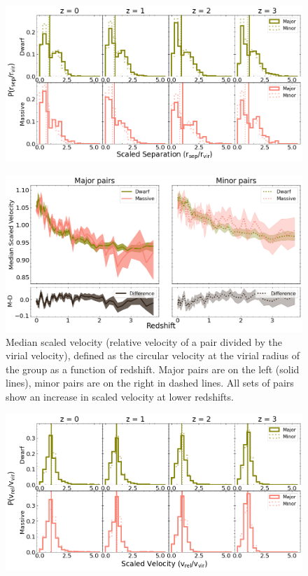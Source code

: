 \documentclass[twocolumn]{aastex631}
\begin{document}
\begin{figure}[htp]
  \centering
  \includegraphics[width=\textwidth]{scaledsep_distribution.png}
  \caption{}
  \label{fig:sep-scaled-dist}
\end{figure} 


\begin{figure}[htp]
  \centering
  \includegraphics[width=\textwidth]{scaledvel.png}
  \caption{Median scaled velocity (relative velocity of a pair divided by the virial velocity), defined as the circular velocity at the virial radius of the group as a function of redshift. 
  Major pairs are on the left (solid lines), minor pairs are on the right in dashed lines.
  All sets of pairs show an increase in scaled velocity at lower redshifts.
  }
  \label{fig:vel-scaled}
\end{figure} 

\begin{figure}[htp]
  \centering
  \includegraphics[width=\textwidth]{scaledvel_distribution.png}
  \caption{}
  \label{fig:vel-scaled-dist}
\end{figure} 
\end{document}
